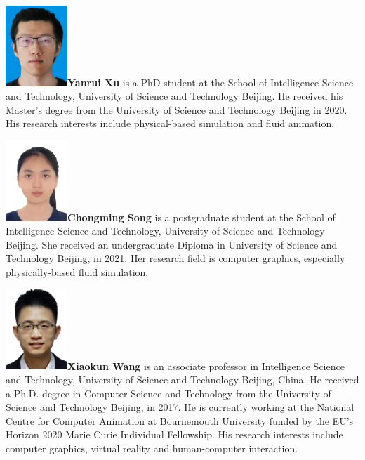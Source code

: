 \documentclass[VANCOUVER,STIX1COL]{WileyNJD-v2}
\begin{document}
\begin{biography}{\includegraphics[width=66pt,height=86pt]{VANCOUVER/figure/photos/YanruiXu.jpg}}{\textbf{Yanrui Xu} is a PhD student at the School of Intelligence Science and Technology, University of Science and Technology Beijing. 
    He received his Master's degree from the University of Science and Technology Beijing in 2020. 
    His research interests include physical-based simulation and fluid animation.}
\end{biography}

\vspace{7ex}

\begin{biography}{\includegraphics[width=66pt,height=86pt]{VANCOUVER/figure/photos/ChongmingSong.JPG}}{\textbf{Chongming Song} is a postgraduate student  at the School of Intelligence Science and Technology, University of Science and Technology Beijing. She received an undergraduate Diploma in University of Science and Technology Beijing, in 2021. Her research field is computer graphics, especially physically-based fluid simulation.}
\end{biography}

\vspace{7ex}

\begin{biography}{\includegraphics[width=66pt,height=86pt]{VANCOUVER/figure/photos/XiaokunWang.jpg}}{\textbf{Xiaokun Wang} is an associate professor in Intelligence Science and Technology, University of Science and Technology Beijing, China. He received a Ph.D. degree in Computer Science and Technology from the University of Science and Technology Beijing, in 2017. He is currently working at the National Centre for Computer Animation at Bournemouth University funded by the EU's Horizon 2020 Marie Curie Individual Fellowship. His research interests include computer graphics, virtual reality and human-computer interaction.}
\end{biography}
\end{document}
